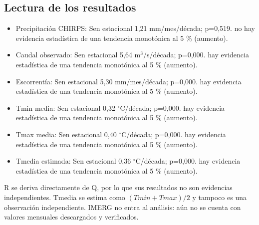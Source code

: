 \subsection*{Lectura de los resultados}
\begin{itemize}
\item Precipitación CHIRPS: Sen estacional 1,21 mm/mes/década; p=0,519. no hay evidencia estadística de una tendencia monotónica al 5 \% (aumento).
\item Caudal observado: Sen estacional 5,64 m$^3$/s/década; p=0,000. hay evidencia estadística de una tendencia monotónica al 5 \% (aumento).
\item Escorrentía: Sen estacional 5,30 mm/mes/década; p=0,000. hay evidencia estadística de una tendencia monotónica al 5 \% (aumento).
\item Tmin media: Sen estacional 0,32 $^\circ$C/década; p=0,000. hay evidencia estadística de una tendencia monotónica al 5 \% (aumento).
\item Tmax media: Sen estacional 0,40 $^\circ$C/década; p=0,000. hay evidencia estadística de una tendencia monotónica al 5 \% (aumento).
\item Tmedia estimada: Sen estacional 0,36 $^\circ$C/década; p=0,000. hay evidencia estadística de una tendencia monotónica al 5 \% (aumento).
\end{itemize}
R se deriva directamente de Q, por lo que sus resultados no son evidencias
independientes. Tmedia se estima como $(Tmin+Tmax)/2$ y tampoco es una
observación independiente. IMERG no entra al análisis: aún no se cuenta con
valores mensuales descargados y verificados.
